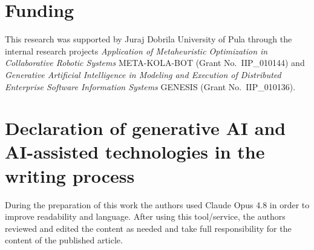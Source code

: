 \section*{Funding}

This research was supported by Juraj Dobrila University of Pula through the
internal research projects \textit{Application of Metaheuristic Optimization in
Collaborative Robotic Systems} META-KOLA-BOT (Grant No.\ IIP\_010144) and
\textit{Generative Artificial Intelligence in Modeling and Execution of
Distributed Enterprise Software Information Systems} GENESIS (Grant
No.\ IIP\_010136).


\section*{Declaration of generative AI and AI-assisted technologies in the writing process}

%
%
During the preparation of this work the authors used Claude Opus 4.8 in order to improve readability and language. After using this tool/service, the authors reviewed and edited the content as needed and take full responsibility for the content of the published article.

